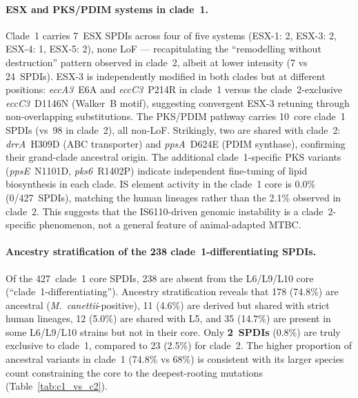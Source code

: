 \documentclass[11pt,a4paper]{article}
\begin{document}
\paragraph{ESX and PKS/PDIM systems in clade~1.}
Clade~1 carries 7~ESX SPDIs across four of five systems (ESX-1: 2,
ESX-3: 2, ESX-4: 1, ESX-5: 2), none LoF --- recapitulating the ``remodelling
without destruction'' pattern observed in clade~2, albeit at lower intensity
(7 vs 24~SPDIs).
%
ESX-3 is independently modified in both clades but at different positions:
\textit{eccA3}~E6A and \textit{eccC3}~P214R in clade~1 versus the
clade~2-exclusive \textit{eccC3}~D1146N (Walker~B motif), suggesting
convergent ESX-3 retuning through non-overlapping substitutions.
%
The PKS/PDIM pathway carries 10~core clade~1 SPDIs (vs~98 in clade~2),
all non-LoF. Strikingly, two are shared with clade~2:
\textit{drrA}~H309D (ABC transporter) and \textit{ppsA}~D624E (PDIM
synthase), confirming their grand-clade ancestral origin. The additional
clade~1-specific PKS variants (\textit{ppsE}~N1101D, \textit{pks6}~R1402P)
indicate independent fine-tuning of lipid biosynthesis in each clade.
%
IS element activity in the clade~1 core is 0.0\% (0/427~SPDIs), matching
the human lineages rather than the 2.1\% observed in clade~2. This suggests
that the IS6110-driven genomic instability is a clade~2-specific phenomenon,
not a general feature of animal-adapted MTBC.

\paragraph{Ancestry stratification of the 238 clade~1-differentiating SPDIs.}
Of the 427~clade~1 core SPDIs, 238 are absent from the L6/L9/L10 core
(``clade~1-differentiating'').
%
Ancestry stratification reveals that 178 (74.8\%) are ancestral
(\textit{M.~canettii}-positive), 11 (4.6\%) are derived but shared with
strict human lineages, 12 (5.0\%) are shared with L5, and 35 (14.7\%)
are present in some L6/L9/L10 strains but not in their core.
%
Only \textbf{2~SPDIs} (0.8\%) are truly exclusive to clade~1, compared
to 23 (2.5\%) for clade~2.
The higher proportion of ancestral variants in clade~1 (74.8\% vs 68\%)
is consistent with its larger species count constraining the core to the
deepest-rooting mutations (Table~\ref{tab:c1_vs_c2}).
\end{document}
